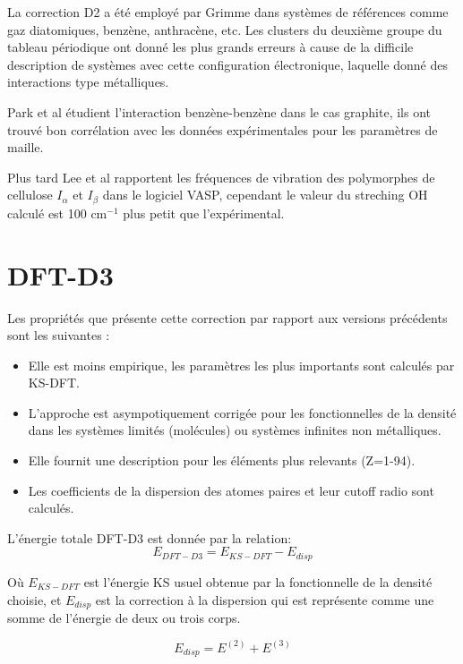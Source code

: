 	La correction D2 a été employé par Grimme \cite{grimme2006semiempirical} dans systèmes de références comme gaz diatomiques, benzène, anthracène, etc. Les clusters du deuxième groupe du tableau périodique ont donné les plus grands erreurs à cause de la difficile description de systèmes avec cette configuration électronique, laquelle donné des interactions type métalliques.  
	
	Park et al \cite{park2011ab} étudient l'interaction benzène-benzène dans le cas graphite, ils ont trouvé bon corrélation avec les données expérimentales pour les paramètres de maille. 
	
	Plus tard Lee et al \cite{lee2013sum} rapportent les fréquences de vibration des polymorphes de cellulose $I_{\alpha}$ et $I_{\beta}$ dans le logiciel VASP, cependant le valeur du streching OH calculé est 100 cm$^{-1}$ plus petit que l'expérimental. 
	
	
 	\section{DFT-D3}
	
	Les propriétés que présente cette correction par rapport aux versions précédents sont les suivantes :
	\bigskip 
	\begin{itemize}
		\item Elle est moins empirique, les paramètres les plus importants sont calculés par KS-DFT.
		\item L'approche est asympotiquement corrigée pour les fonctionnelles de la densité dans les systèmes limités (molécules) ou systèmes infinites non métalliques.
		\item Elle fournit une description pour les éléments plus relevants (Z=1-94).
		\item Les coefficients de la dispersion des atomes paires et leur cutoff radio sont calculés. 
	\end{itemize}
	\bigskip
	
	L'énergie totale DFT-D3 est donnée par la relation:	
	\begin{equation}
	E_{DFT-D3} = E_{KS-DFT} - E_{disp}
	\end{equation} 
	\bigskip
	
	Où $E_{KS-DFT}$ est l'énergie KS usuel obtenue par la fonctionnelle de la densité choisie, et $E_{disp}$ est la correction à la dispersion qui est représente comme une somme de l'énergie de deux ou trois corps.
	
	\begin{equation}
	E_{disp} = E ^{(2)} + E^{(3)}
	\end{equation}
	
